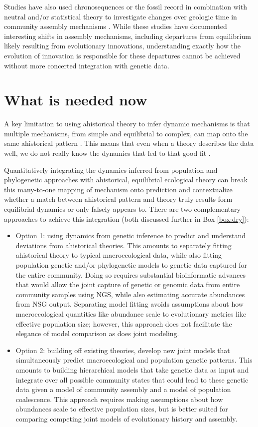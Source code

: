 \documentclass[12pt]{article}
\newcounter{Box}
\begin{document}
Studies have also used chronosequences or the fossil record in
combination with neutral and/or statistical theory to investigate
changes over geologic time in community assembly mechanisms
\citep{wagner2006, rominger2015}. While these
studies have documented interesting shifts in assembly mechanisms,
including departures from equilibrium likely resulting from
evolutionary innovations, understanding exactly how the evolution of
innovation is responsible for these departures cannot be achieved
without more concerted integration with genetic data.

\section{What is needed now}


A key limitation to using ahistorical theory to infer dynamic
mechanisms is that multiple mechanisms, from simple and equilibrial to
complex, can map onto the same ahistorical pattern
\citep{engen1996lnorm, mcgill2003}. This means that even when a theory
describes the data well, we do not really know the dynamics that led
to that good fit \citep{ricklefs2006}.

Quantitatively integrating the dynamics inferred from population and
phylogenetic approaches with ahistorical, equilibrial ecological
theory can break this many-to-one mapping of mechanism onto prediction
and contextualize whether a match between ahistorical pattern and
theory truly results form equilibrial dynamics or only falsely
appears to. There are two complementary approaches to achieve this
integration (both discussed further in Box \ref{box:dry}):

\begin{itemize}
\item Option 1: using dynamics from genetic inference to predict and
  understand deviations from ahistorical theories. This amounts to
  separately fitting ahistorical theory to typical macroecological
  data, while also fitting population genetic and/or phylogenetic
  models to genetic data captured for the entire community. Doing so
  requires substantial bioinformatic advances that would allow the
  joint capture of genetic or genomic data from entire community
  samples using NGS, while also estimating accurate abundances from
  NSG output. Separating model fitting avoids assumptions about how
  macroecological quantities like abundance scale to evolutionary
  metrics like effective population size; however, this approach does
  not facilitate the elegance of model comparison as does joint modeling.
\item Option 2: building off existing theories, develop new joint
  models that simultaneously predict macroecological and population
  genetic patterns. This amounts to building hierarchical models that
  take genetic data as input and integrate over all possible community
  states that could lead to these genetic data given a model of
  community assembly and a model of population coalescence. This
  approach requires making assumptions about how abundances scale to
  effective population sizes, but is better suited for comparing
  competing joint models of evolutionary history and assembly.
\end{itemize}
\end{document}
